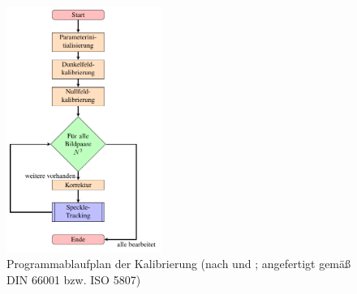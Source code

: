\begin{figure}[htbp]
	\centering
	\includegraphics[width=0.45\textwidth]{pdf/graph_init}
	\caption[Kalibrierung]{Programmablaufplan der Kalibrierung (nach  und \cite{Coj17}; angefertigt gemäß DIN 66001 bzw. ISO 5807)}
	\label{fig:graph_kalibrierung}
\end{figure}

